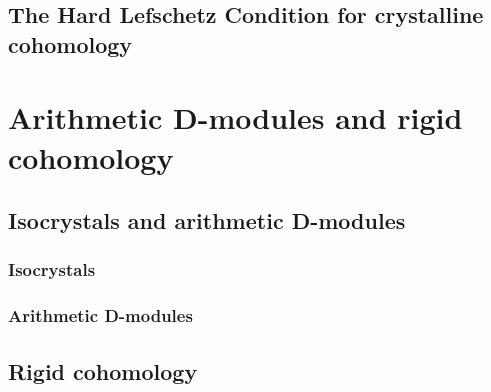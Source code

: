        \subsection{The Hard Lefschetz Condition for crystalline cohomology}
        
    \section{Arithmetic D-modules and rigid cohomology}
        \subsection{Isocrystals and arithmetic D-modules}
            \subsubsection{Isocrystals}
            
            \subsubsection{Arithmetic D-modules}
        
        \subsection{Rigid cohomology}